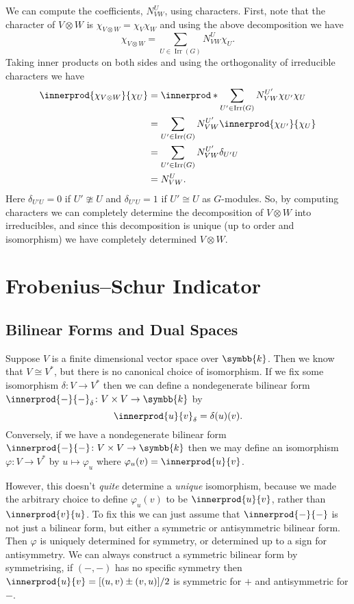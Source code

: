 \documentclass[fleqn]{NotesClass}
\renewcommand{\field}{\symbb{k}}
\newcommand{\isomorphic}{\cong}
\DeclareMathOperator{\Irr}{Irr}
\begin{document}
    We can compute the coefficients, \(N^U_{VW}\), using characters.
    First, note that the character of \(V \otimes W\) is \(\chi_{V \otimes W} = \chi_V \chi_W\) and using the above decomposition we have
    \begin{equation}
        \chi_{V \otimes W} = \sum_{U \in \Irr(G)} N^U_{VW} \chi_U.
    \end{equation}
    Taking inner products on both sides and using the orthogonality of irreducible characters we have
    \begin{align}
        \innerprod{\chi_{V \otimes W}}{\chi_U} &= \innerprod*{\sum_{U' \in \Irr(G)} N^{U'}_{VW}\chi_{U'}}{\chi_U}\\
        &= \sum_{U' \in \Irr(G)} N^{U'}_{VW} \innerprod{\chi_{U'}}{\chi_U}\\
        &= \sum_{U' \in \Irr(G)} N^{U'}_{VW} \delta_{U'U}\\
        &= N^U_{VW}.
    \end{align}
    Here \(\delta_{U'U} = 0\) if \(U' \ncong U\) and \(\delta_{U'U} = 1\) if \(U' \isomorphic U\) as \(G\)-modules.
    So, by computing characters we can completely determine the decomposition of \(V \otimes W\) into irreducibles, and since this decomposition is unique (up to order and isomorphism) we have completely determined \(V \otimes W\).
    
    \section{Frobenius--Schur Indicator}
    \subsection{Bilinear Forms and Dual Spaces}
    Suppose \(V\) is a finite dimensional vector space over \(\field\).
    Then we know that \(V \isomorphic V^*\), but there is no canonical choice of isomorphism.
    If we fix some isomorphism \(\delta \colon V \to V^*\) then we can define a nondegenerate bilinear form \(\innerprod{-}{-}_\delta \colon V \times V \to \field\) by
    \begin{equation}
        \innerprod{u}{v}_\delta = \delta(u)(v). 
    \end{equation}
    Conversely, if we have a nondegenerate bilinear form \(\innerprod{-}{-} \colon V \times V \to \field\) then we may define an isomorphism \(\varphi \colon V \to V^*\) by \(u \mapsto \varphi_u\) where \(\varphi_u(v) = \innerprod{u}{v}\).
    
    However, this doesn't \emph{quite} determine a \emph{unique} isomorphism, because we made the arbitrary choice to define \(\varphi_u(v)\) to be \(\innerprod{u}{v}\), rather than \(\innerprod{v}{u}\).
    To fix this we can just assume that \(\innerprod{-}{-}\) is not just a bilinear form, but either a symmetric or antisymmetric bilinear form.
    Then \(\varphi\) is uniquely determined for symmetry, or determined up to a sign for antisymmetry.
    We can always construct a symmetric bilinear form by symmetrising, if \((-,-)\) has no specific symmetry then \(\innerprod{u}{v} = [(u, v) \pm (v, u)]/2\) is symmetric for \(+\) and antisymmetric for \(-\).
    
\end{document}
